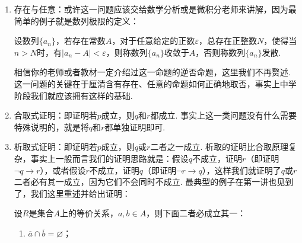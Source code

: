 \begin{enumerate}
          \begin{example*}{}{}
              证明：欧拉常数存在，或者说数列
              \[a_n=1+\dfrac{1}{2}+\cdots+\dfrac{1}{n}-\ln n\]
              有极限（极限值记为$\gamma$，称之为欧拉常数）.
          \end{example*}
          \begin{proof}
              高中熟知对数不等式
              \[\frac{x}{1+x}\leqslant\ln(1+x)\leqslant x,\enspace x>-1,\]
              这一不等式使用求导的方法即可证明，等号成立当且仅当$x=0$，因此我们令$x=\dfrac{1}{n}$，则
              \[\frac{1}{n+1}<\ln\left(1+\frac{1}{n}\right)<\frac{1}{n},\]
              基于此，我们有
              \[a_{n+1}-a_n=\frac{1}{n+1}-\ln\left(1+\frac{1}{n}\right)<0,\]
              因此数列$\{a_n\}$单调递减，又因为
              \begin{align*}
                  x_n & =\sum\limits_{k=1}^n\frac{1}{k}-\ln(\frac{n}{n-1}\cdot \frac{n-1}{n-2}\cdots\frac{2}{1}) \\
                      & =\sum\limits_{k=1}^n\frac{1}{k}-\sum\limits_{k=1}^{n-1}\ln(1+\frac{1}{k})                \\
                      & =\sum\limits_{k=1}^n\left(\frac{1}{k}-\ln(1+\frac{1}{k})\right)+\frac{1}{n}              \\
                      & >\frac{1}{n}>0,
              \end{align*}
              因此数列$\{a_n\}$有下界，因此数列$\{a_n\}$收敛.
          \end{proof}

    \item 存在与任意：或许这一问题应该交给数学分析或是微积分老师来讲解，因为最简单的例子就是数列极限的定义：
          \begin{definition}{}{}
              设数列$\{a_n\}$，若存在常数$A$，对于任意给定的正数$\varepsilon$，总存在正整数$N$，使得当$n>N$时，有$|a_n-A|<\varepsilon$，则称数列$\{a_n\}$收敛于$A$，否则称数列$\{a_n\}$发散.
          \end{definition}

          相信你的老师或者教材一定介绍过这一命题的逆否命题，这里我们不再赘述. 这一问题的关键在于厘清含有存在、任意的命题如何正确地取否，事实上中学阶段我们就应该拥有这样的基础.

    \item 合取式证明：即证明若$p$成立，则$q$和$r$都成立. 事实上这一类问题没有什么需要特殊说明的，就是将$q$和$r$都单独证明即可.

    \item 析取式证明：即证明若$p$成立，则$q$或$r$二者之一成立. 析取的证明比合取原理复杂，事实上一般而言我们的证明思路就是：假设$q$不成立，证明$r$（即证明$\lnot q\to r$），或者假设$r$不成立，证明$q$（即证明$\lnot r\to q$），这样我们就证明了$q$或$r$二者必有其一成立，因为它们不会同时不成立. 最典型的例子在第一讲也见到了，我们这里重述并给出证明：
          \begin{theorem}{}{}
              设$R$是集合$A$上的等价关系，$a,b\in A$，则下面二者必成立其一：
              \begin{enumerate}
                  \item $\overline{a}\cap\overline{b}=\varnothing$；


\end{enumerate}
\end{theorem}
\end{enumerate}
